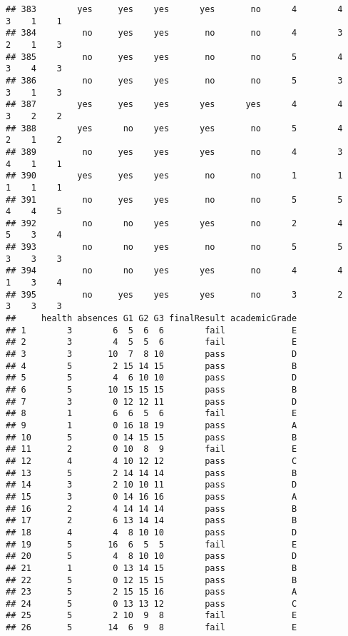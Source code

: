 \documentclass[
]{article}
\begin{document}
\begin{verbatim}
## 383        yes     yes    yes      yes       no      4        4     3    1    1
## 384         no     yes    yes       no       no      4        3     2    1    3
## 385         no     yes    yes       no       no      5        4     3    4    3
## 386         no     yes    yes       no       no      5        3     3    1    3
## 387        yes     yes    yes      yes      yes      4        4     3    2    2
## 388        yes      no    yes      yes       no      5        4     2    1    2
## 389         no     yes    yes      yes       no      4        3     4    1    1
## 390        yes     yes    yes       no       no      1        1     1    1    1
## 391         no     yes    yes       no       no      5        5     4    4    5
## 392         no      no    yes      yes       no      2        4     5    3    4
## 393         no      no    yes       no       no      5        5     3    3    3
## 394         no      no    yes      yes       no      4        4     1    3    4
## 395         no     yes    yes      yes       no      3        2     3    3    3
##     health absences G1 G2 G3 finalResult academicGrade
## 1        3        6  5  6  6        fail             E
## 2        3        4  5  5  6        fail             E
## 3        3       10  7  8 10        pass             D
## 4        5        2 15 14 15        pass             B
## 5        5        4  6 10 10        pass             D
## 6        5       10 15 15 15        pass             B
## 7        3        0 12 12 11        pass             D
## 8        1        6  6  5  6        fail             E
## 9        1        0 16 18 19        pass             A
## 10       5        0 14 15 15        pass             B
## 11       2        0 10  8  9        fail             E
## 12       4        4 10 12 12        pass             C
## 13       5        2 14 14 14        pass             B
## 14       3        2 10 10 11        pass             D
## 15       3        0 14 16 16        pass             A
## 16       2        4 14 14 14        pass             B
## 17       2        6 13 14 14        pass             B
## 18       4        4  8 10 10        pass             D
## 19       5       16  6  5  5        fail             E
## 20       5        4  8 10 10        pass             D
## 21       1        0 13 14 15        pass             B
## 22       5        0 12 15 15        pass             B
## 23       5        2 15 15 16        pass             A
## 24       5        0 13 13 12        pass             C
## 25       5        2 10  9  8        fail             E
## 26       5       14  6  9  8        fail             E

\end{verbatim}
\end{document}
